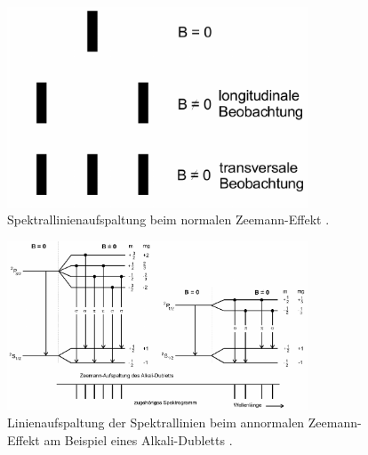 \begin{figure}[htb]
  \centering
  \includegraphics[width=0.8\textwidth]{images/V27_4.pdf}
  \caption{Spektrallinienaufspaltung beim normalen Zeemann-Effekt \cite{anleitung}.}
  \label{abb:spektral}
\end{figure}

\begin{figure}[htb]
  \centering
  \includegraphics[width=0.8\textwidth]{images/V27_5.pdf}
  \caption{Linienaufspaltung der Spektrallinien beim annormalen Zeemann-Effekt
  am Beispiel eines Alkali-Dubletts \cite{anleitung}.}
  \label{abb:annormal}
\end{figure}
